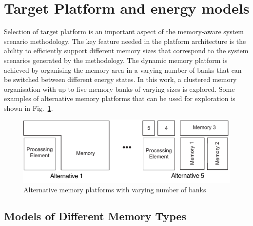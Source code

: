 \section{Target Platform and energy models}

Selection of target platform is an important aspect of the memory-aware system scenario methodology. The key feature needed in the platform architecture is the ability to efficiently support different memory sizes that correspond to the system scenarios generated by the methodology. The dynamic memory platform is achieved by organising the memory area in a varying number of banks that can be switched between different energy states. In this work, a clustered memory organisation with up to five memory banks of varying sizes is explored. Some examples of alternative memory platforms that can be used for exploration is shown in Fig.~\ref{fig:platform}.

\begin{figure}[!t]
\centering
\includegraphics[width=\textwidth]{B/Images/platform.pdf}
\caption{Alternative memory platforms with varying number of banks}
\label{fig:platform}
\end{figure}


\subsection{Models of Different Memory Types}

